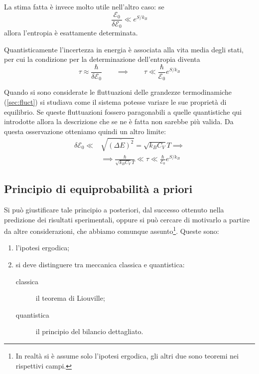 La stima fatta è invece molto utile nell'altro caso: se
\begin{equation*}
\frac{\mathcal{E}_0}{\delta \mathcal{E}_0} \ll e^{S/k_B}
\end{equation*}
\noindent allora l'entropia è esattamente determinata.

Quantisticamente l'incertezza in energia è associata alla vita media degli stati, per cui la condizione per la determinazione dell'entropia diventa
\begin{equation*}
\tau \approx \frac{\hbar}{\delta \mathcal{E}_0} \qquad \implies \qquad \tau \ll \frac{\hbar}{\mathcal{E}_0} e^{S/k_B}
\end{equation*}

Quando si sono considerate le fluttuazioni delle grandezze termodinamiche (\cref{sec:fluct}) si studiava come il sistema potesse variare le sue proprietà di equilibrio. Se queste fluttuazioni fossero paragonabili a quelle quantistiche qui introdotte allora la descrizione che se ne è fatta non sarebbe più valida. Da questa osservazione otteniamo quindi un altro limite:
\begin{align*}
\delta \mathcal{E}_0 \ll &\sqrt{\overline{(\Delta E)^2}} = \sqrt{k_B C_V} T \implies\\
&\implies \frac{\hbar}{\sqrt{k_B C_V} T} \ll \tau \ll \frac{\hbar}{\mathcal{E}_0} e^{S/k_B}
\end{align*}

\subsection{Principio di equiprobabilità a priori}
Si può giustificare tale principio a posteriori, dal successo ottenuto nella predizione dei risultati sperimentali, oppure si può cercare di motivarlo a partire da altre considerazioni, che abbiamo comunque assunto\footnote{In realtà si è assume solo l'ipotesi ergodica, gli altri due sono teoremi nei rispettivi campi.}. Queste sono:
\begin{enumerate}
	\item l'ipotesi ergodica;
	\item si deve distinguere tra meccanica classica e quantistica:
	\begin{description}
		\item[classica] il teorema di Liouville;
		\item[quantistica] il principio del bilancio dettagliato.
	\end{description}
\end{enumerate}

